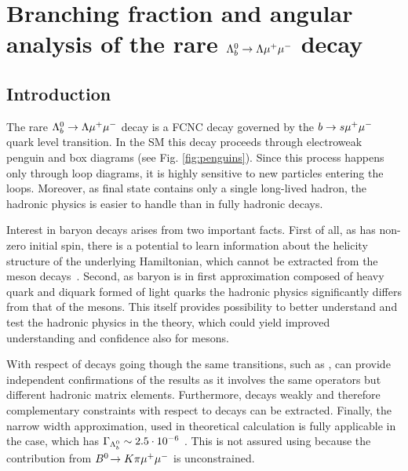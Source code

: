 \part{Branching fraction and angular analysis of the rare $\Lambda^0_b\rightarrow\Lambda\mu^+\mu^-$ decay}

\chapter{Introduction}
\label{sec:Introduction}

The rare $\Lambda^0_b\rightarrow\Lambda\mu^+\mu^-$ decay is a FCNC decay governed by the $b \rightarrow s\mu^+\mu^-$ quark
level transition. In the SM this decay proceeds through electroweak penguin and \W box diagrams
(see Fig. \ref{fig:penguins}). Since this process happens only through loop diagrams, it is highly sensitive
to new particles entering the loops. Moreover, as final state contains only a single long-lived hadron,
the hadronic physics is easier 
to handle than in fully hadronic decays.

Interest in \Lb baryon decays arises from two important facts.
First of all, as \Lb has non-zero initial spin, there is a potential to learn information about the helicity structure
of the underlying Hamiltonian, which cannot be extracted from the meson decays~\cite{Hiller:2007ur,Mannel:1997xy}.
Second, as \Lb baryon is in first approximation
composed of heavy quark and diquark formed of light quarks the hadronic physics significantly differs from that of the mesons.
This itself provides possibility to better understand and test the hadronic physics in the theory,
which could yield improved understanding and confidence also for mesons.

With respect of \Bz decays going though the same transitions, such as \BdToKstmm, \Lz can provide independent
confirmations of the results as it involves the same operators but different hadronic matrix elements.
Furthermore, \Lz decays weakly and therefore complementary constraints with respect to \Bz decays can be extracted.
Finally, the narrow width approximation, used in theoretical calculation is fully applicable in the \Lb case,
which has $\Gamma_{\Lambda^0_b} \sim 2.5 \cdot 10^{-6}$ \ev. This is not assured using \BdToKstmm because
the contribution from $\decay{\Bz}{K\pi\mumu}$ is unconstrained.

